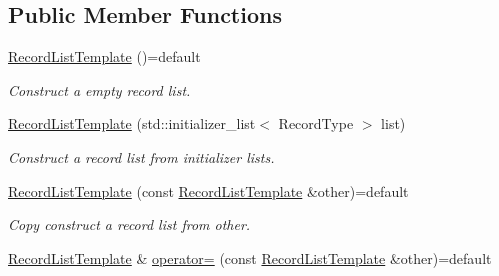 \subsection*{Public Member Functions}
\begin{DoxyCompactItemize}
\item 
\hyperlink{class_mdt_1_1_plain_text_1_1_record_list_template_aafe80579c379230512b75b84e199661b}{Record\+List\+Template} ()=default\hypertarget{class_mdt_1_1_plain_text_1_1_record_list_template_aafe80579c379230512b75b84e199661b}{}\label{class_mdt_1_1_plain_text_1_1_record_list_template_aafe80579c379230512b75b84e199661b}

\begin{DoxyCompactList}\small\item\em Construct a empty record list. \end{DoxyCompactList}\item 
\hyperlink{class_mdt_1_1_plain_text_1_1_record_list_template_a7355c51d8c8f7218b46f1dbdd65fe514}{Record\+List\+Template} (std\+::initializer\+\_\+list$<$ Record\+Type $>$ list)\hypertarget{class_mdt_1_1_plain_text_1_1_record_list_template_a7355c51d8c8f7218b46f1dbdd65fe514}{}\label{class_mdt_1_1_plain_text_1_1_record_list_template_a7355c51d8c8f7218b46f1dbdd65fe514}

\begin{DoxyCompactList}\small\item\em Construct a record list from initializer lists. \end{DoxyCompactList}\item 
\hyperlink{class_mdt_1_1_plain_text_1_1_record_list_template_a09ac82a5ab35a269fbb3bb0a28d3f4fc}{Record\+List\+Template} (const \hyperlink{class_mdt_1_1_plain_text_1_1_record_list_template}{Record\+List\+Template} \&other)=default\hypertarget{class_mdt_1_1_plain_text_1_1_record_list_template_a09ac82a5ab35a269fbb3bb0a28d3f4fc}{}\label{class_mdt_1_1_plain_text_1_1_record_list_template_a09ac82a5ab35a269fbb3bb0a28d3f4fc}

\begin{DoxyCompactList}\small\item\em Copy construct a record list from {\itshape other}. \end{DoxyCompactList}\item 
\hyperlink{class_mdt_1_1_plain_text_1_1_record_list_template}{Record\+List\+Template} \& \hyperlink{class_mdt_1_1_plain_text_1_1_record_list_template_adb8412269238f4ac6359716124e5cc7c}{operator=} (const \hyperlink{class_mdt_1_1_plain_text_1_1_record_list_template}{Record\+List\+Template} \&other)=default\hypertarget{class_mdt_1_1_plain_text_1_1_record_list_template_adb8412269238f4ac6359716124e5cc7c}{}\label{class_mdt_1_1_plain_text_1_1_record_list_template_adb8412269238f4ac6359716124e5cc7c}


\end{DoxyCompactItemize}
